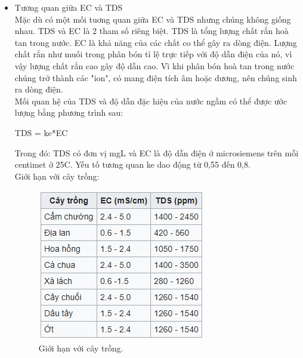 \documentclass[a4paper,12pt,oneside]{article}
\begin{document}
\begin{itemize}
\item Tương quan giữa EC và TDS\\
Mặc dù có một mối tuơng quan giữa EC và TDS nhưng chúng không giống nhau. TDS và EC là 2 tham số riêng biệt. TDS là tổng lượng chất rắn hoà tan trong nước. EC là khả năng của các chất co thể gây ra dòng điện. Lượng chất rắn như muối trong phân bón tỉ lệ trực tiếp với độ dẫn điện của nó, vì vậy lượng chất rắn cao gây độ dẫn cao. Vì khi phân bón hoà tan trong nước chúng trở thành các "ion", có mang điện tích âm hoặc dương, nên chúng sinh ra dòng điện.\\
Mối quan hệ của TDS và độ dẫn đặc hiệu của nước ngầm có thể được ước lượng bằng phương trình sau:
\begin{center}
		TDS = ke*EC
\end{center}					
Trong đó: TDS có đơn vị mg\/L và EC là độ dẫn điện ở microsiemens trên mỗi centimet ở 25\textdegree{}C. Yếu tố tương quan ke dao động từ 0,55 đến 0,8.\\
Giới hạn với cây trồng:
\begin{figure}[H]
\centering
\begin{center}
\includegraphics[scale=.8]{hinh/PPM/ppm_thamkhao.PNG}
\end{center}
\caption{Giới hạn với cây trồng.}
\end{figure}


\end{itemize}
\end{document}
